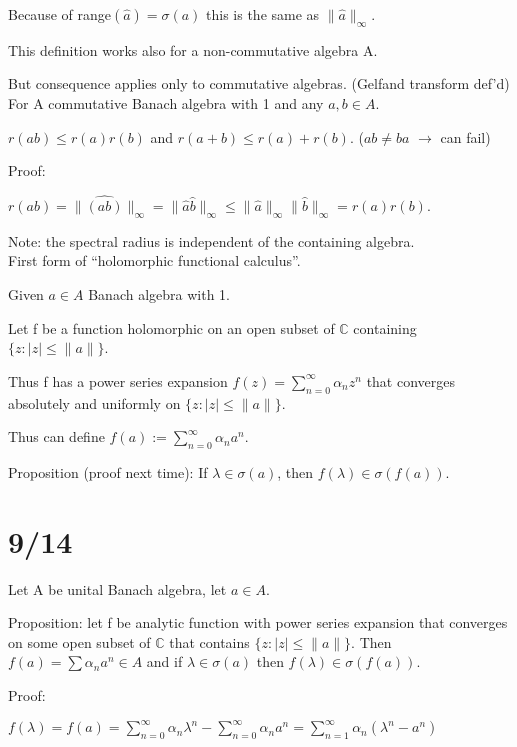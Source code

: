 \documentclass[12pt]{article}
\begin{document}
Because of range$(\hat{a}) = \sigma(a)$ this is the same as $\|\hat{a}\|_\infty$.

This definition works also for a non-commutative algebra A.

But consequence applies only to commutative algebras. (Gelfand transform def'd)\\

\noindent
For A commutative Banach algebra with 1 and any $a, b \in A$.

$r(ab) \leq r(a)r(b)$ and $r(a + b) \leq r(a) + r(b)$. ($ab \neq ba$ $\to$ can fail)

\noindent
Proof:

$r(ab) = \|\hat{(ab)}\|_\infty = \|\hat{a}\hat{b}\|_\infty \leq \|\hat{a}\|_\infty\|\hat{b}\|_\infty = r(a)r(b)$.

\noindent
Note: the spectral radius is independent of the containing algebra.\\

\noindent
First form of ``holomorphic functional calculus''.

\noindent
Given $a \in A$ Banach algebra with 1.

Let f be a function holomorphic on an open subset of $\mathds{C}$ containing $\{z : |z| \leq \|a\|\}$.

Thus f has a power series expansion $f(z) = \sum_{n = 0}^\infty \alpha_nz^n$ that converges absolutely and uniformly on $\{z : |z| \leq \|a\|\}$.

Thus can define $f(a) := \sum_{n = 0}^\infty\alpha_n a^n$.

\noindent
Proposition (proof next time): If $\lambda \in \sigma(a)$, then $f(\lambda) \in \sigma(f(a))$.

\section{9/14}

Let A be unital Banach algebra, let $a \in A$.

\noindent
Proposition: let f be analytic function with power series expansion that converges on some open subset of $\mathds{C}$ that contains $\{z : |z| \leq \|a\|\}$.  Then $f(a) = \sum \alpha_n a^n \in A$ and if $\lambda \in \sigma(a)$ then $f(\lambda) \in \sigma(f(a))$.

\noindent
Proof:

$f(\lambda) = f(a) = \sum_{n=0}^\infty \alpha_n\lambda^n - \sum_{n=0}^\infty \alpha_na^n = \sum_{n = 1}^\infty \alpha_n(\lambda^n - a^n)$\\
\end{document}
